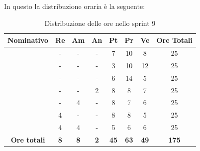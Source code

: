 In questo  la distribuzione oraria è la seguente:
\begin{table}[H]
		\begin{center}
			\setlength{\aboverulesep}{0pt}
			\setlength{\belowrulesep}{0pt}
			\setlength{\extrarowheight}{.75ex}
			\begin{tabular}{ c c c c c c c c }
				\rowcolor{AzzurroGruppo!30} 
				\textbf{Nominativo} & \textbf{Re} & \textbf{Am} & \textbf{An} & \textbf{Pt} & \textbf{Pr} & \textbf{Ve} & \textbf{Ore Totali}  \\
				\toprule
				\Davide    & - & - & - & 7 & 10 & 8 & 25 \\
				\Giosue    & - & - & - & 3 & 10 & 12 & 25 \\
				\Francesco & - & - & - & 6 & 14 & 5 & 25 \\
				\Daniele   & - & - & 2 & 8 & 8 & 7 & 25 \\
				\Lucrezia  & - & 4 & - & 8 & 7 & 6 & 25 \\
				\Matteo    & 4 & - & - & 8 & 8 & 5 & 25 \\
				\Tommaso   & 4 & 4 & - & 5 & 6 & 6 & 25 \\
				 \textbf{Ore totali} & \textbf{8} & \textbf{8} & \textbf{2} & \textbf{45} & \textbf{63} & \textbf{49} & \textbf{175} \\
				\bottomrule
			\end{tabular}
			\caption{Distribuzione delle ore nello sprint 9}
		\end{center}
	\end{table}


